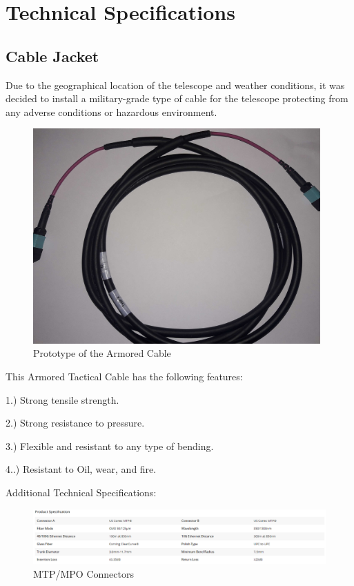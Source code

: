 \section{Technical Specifications}

\subsection{Cable Jacket}

Due to the geographical location of the telescope and weather conditions, it was decided to install a military-grade type of cable for the telescope protecting from any adverse conditions or hazardous environment. 

\begin{figure}
  \includegraphics[width=11cm]{images/mtp_militar_cable.jpg}
  \centering
  \caption{Prototype of the Armored Cable}
  \label{fig:jlsimon}
\end{figure}

This Armored Tactical Cable has the following features:

1.) Strong tensile strength.

2.) Strong resistance to pressure.

3.) Flexible and resistant to any type of bending.

4..) Resistant to Oil, wear, and fire.


Additional Technical Specifications:

\begin{figure}
  \includegraphics[width=\textwidth]{images/2.png}
  \caption{MTP/MPO Connectors}
  \label{fig:jlsimon}
\end{figure}



